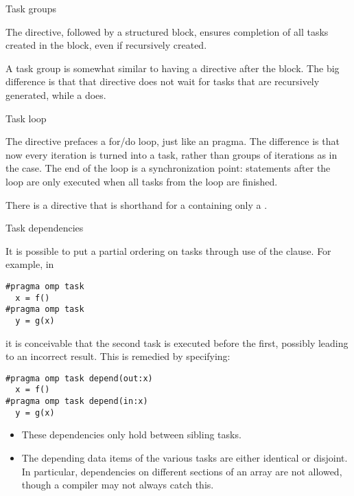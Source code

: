 
 {Task groups}
\label{sec:omp-task-group}

The  directive, followed
by a structured block, ensures completion of all tasks
created in the block, even if recursively created.

A task group is somewhat similar to having a 
directive after the block. The big difference is that that
 directive does not wait for tasks that are recursively
generated, while a  does.

 {Task loop}
\label{sec:omp-task-loop}

The  directive
prefaces a for/do loop, just like an  pragma.
The difference is that now every iteration is turned into a task,
rather than groups of iterations as in the  case.
The end of the loop is a synchronization point:
statements after the loop are only executed
when all tasks from the loop are finished.

There is a  directive
that is shorthand for a 
containing only a .

 {Task dependencies}
\label{sec:omp-task-depend}

It is possible to put a partial ordering on
tasks through use of the  clause. For example, in
\begin{lstlisting}[language=omp]
#pragma omp task
  x = f()
#pragma omp task
  y = g(x)
\end{lstlisting}
it is conceivable that the second task is executed before the first,
possibly leading to an incorrect result. This is remedied by specifying:
\begin{lstlisting}[language=omp]
#pragma omp task depend(out:x)
  x = f()
#pragma omp task depend(in:x)
  y = g(x)
\end{lstlisting}

\begin{itemize}
\item
  These dependencies only hold between sibling tasks.
\item The depending data items of the various tasks
  are either identical or disjoint.
  In particular, dependencies on different sections of an array
  are not allowed, though a compiler may not always catch this.
\end{itemize}

